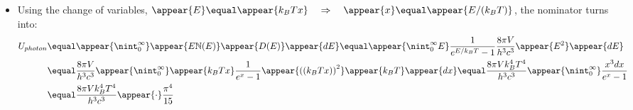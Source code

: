 \begin{frame}
\frametitle{\texorpdfstring{\culine[\sectiontitleulinecolor]{\sectiontitle}}{\sectiontitle} }

\begin{itemize}

\item Using the change of variables, $\appear{E}  \equal \appear{k_{B} T x} \quad \Rightarrow \quad \appear{x}  \equal \appear{E/(k_{B} T)}$, the nominator turns into:
\[
\begin{aligned}
U_{photon}  &\equal  \appear{\nint_{0}^{\infty}} \appear{E  \mathbb{N} (E)} \appear{D(E)} \appear{d E}
 \equal  
 \appear{\nint_{0}^{\infty} E} \frac{1}{e^{E / k_{B} T}-1} \frac{8 \pi V}{h^{3} c^{3}} \appear{E^{2}} \appear{d E} \\
& \equal 
\frac{8 \pi V}{h^{3} c^{3}} \appear{\nint_{0}^{\infty}} \appear{k_{B} T x} \frac{1}{e^{x}-1} \appear{\textrm{((} k_{B} T x \textrm{))} ^{2}} \appear{k_{B} T} \appear{d x}
 \equal 
 \frac{8 \pi V k_{B}^{4} T^{4}}{h^{3} c^{3}} \appear{\nint_{0}^{\infty}} \frac{x^{3} d x}{e^{x}-1}  \\
 &\equal 
 \frac{8 \pi V k_{B}^{4} T^{4}}{h^{3} c^{3}} \appear{\cdot} \frac{\pi^{4}}{15}
\end{aligned}
\]
\end{itemize}


\endofslide 
\end{frame}

